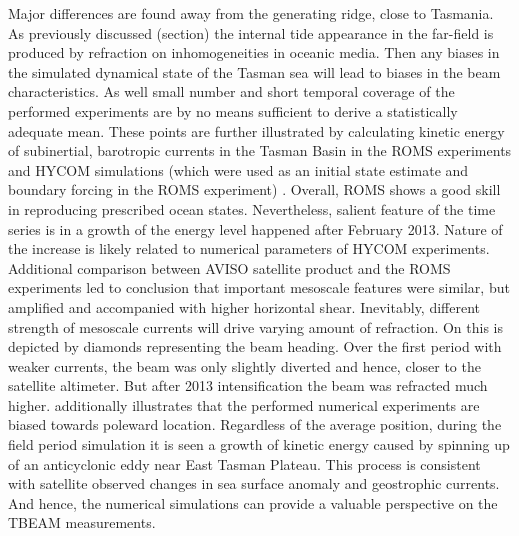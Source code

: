 \documentclass[12pt]{article}
\begin{document}
Major differences are found away from the generating ridge, close to Tasmania. As previously discussed (section)
the internal tide appearance in the far-field is produced by refraction on inhomogeneities in 
oceanic media. Then any biases in the simulated dynamical state of the Tasman sea will lead to 
biases in the beam characteristics. As well small number and short temporal coverage of the 
performed experiments are by no means sufficient to derive a statistically adequate mean. These 
points are further illustrated by calculating kinetic energy of subinertial, barotropic currents in 
the Tasman Basin in the ROMS experiments and HYCOM simulations (which were used as an initial 
state estimate and boundary forcing in the ROMS experiment) . Overall, 
ROMS shows a good skill in reproducing prescribed ocean states. Nevertheless, salient 
feature of the time series is in a growth of the energy level happened after February 2013. Nature 
of the increase is likely related to numerical parameters of HYCOM experiments. Additional 
comparison between AVISO satellite product and the ROMS experiments led to conclusion that 
important mesoscale features were similar, but amplified and accompanied with higher 
horizontal shear. Inevitably, different strength of mesoscale currents will drive varying amount of 
refraction. On  this is depicted by diamonds representing the beam heading. Over the first period with weaker currents, the beam was only slightly diverted and hence, closer to the satellite altimeter. But after 2013 intensification the beam was refracted much higher.  additionally illustrates that the performed numerical experiments are biased towards poleward location. Regardless of the average position, during the field period simulation  it is seen a growth of kinetic energy caused by 
spinning up of an anticyclonic eddy near East Tasman Plateau. This process is consistent with 
satellite observed changes in sea surface anomaly and geostrophic currents. And hence, the 
numerical simulations can provide a valuable perspective on the TBEAM measurements.\\
\end{document}
